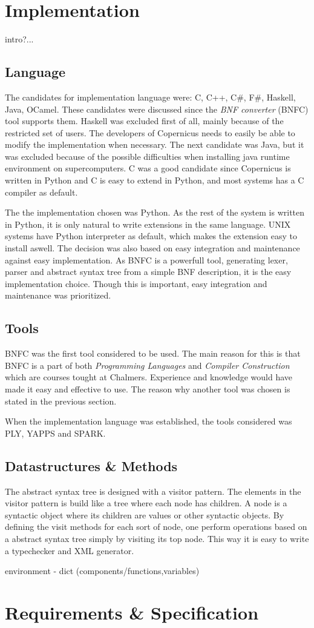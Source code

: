 \section{Implementation}
intro?...

\subsection{Language}
The candidates for implementation language were: C, C++, C\#, F\#,
Haskell, Java, OCamel. These candidates were discussed since the
\emph{BNF converter} (BNFC) tool supports them. \citep{bnfc:online}
Haskell was excluded first of all, mainly because of the restricted
set of users. The developers of Copernicus needs to easily be able to
modify the implementation when necessary. The next candidate was Java,
but it was excluded because of the possible difficulties when
installing java runtime environment on supercomputers. C was a good
candidate since Copernicus is written in Python and C is easy to
extend in Python, and most systems has a C compiler as default.

The the implementation chosen was Python. As the rest of the system is
written in Python, it is only natural to write extensions in the same
language. UNIX systems have Python interpreter as default, which makes
the extension easy to install aswell. The decision was also based on
easy integration and maintenance against easy implementation. As BNFC
is a powerfull tool, generating lexer, parser and abstract syntax tree
from a simple BNF description, it is the easy implementation
choice. Though this is important, easy integration and maintenance was
prioritized.


\subsection{Tools}
BNFC was the first tool considered to be used. The main reason for
this is that BNFC is a part of both \emph{Programming Languages} and
\emph{Compiler Construction} which are courses tought at
Chalmers. Experience and knowledge would have made it easy and
effective to use. The reason why another tool was chosen is stated in
the previous section.

When the implementation language was established, the tools considered
was PLY, YAPPS and SPARK\citep{ply:online,yapps:online,spark:online}.


\subsection{Datastructures \& Methods}
The abstract syntax tree is designed with a visitor pattern. The
elements in the visitor pattern is build like a tree where each node
has children. A node is a syntactic object where its children are
values or other syntactic objects. By defining the visit methods for
each sort of node, one perform operations based on a abstract syntax
tree simply by visiting its top node. This way it is easy to write a
typechecker and XML generator.

environment - dict (components/functions,variables)


\section{Requirements \& Specification}

